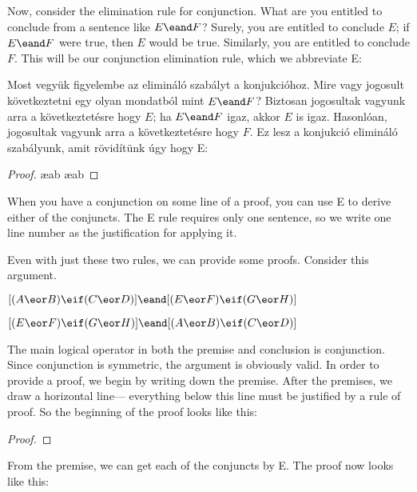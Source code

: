Now, consider the elimination rule for conjunction. What are you entitled to conclude from a sentence like $E \eand F$? Surely, you are entitled to conclude $E$; if $E \eand F$ were true, then $E$ would be true. Similarly, you are entitled to conclude $F$. This will be our conjunction elimination rule, which we abbreviate {\eand}E:

Most vegyük figyelembe az elimináló szabályt a konjukcióhoz. Mire vagy jogosult következtetni egy olyan mondatból mint $E \eand F$?  Biztosan jogosultak vagyunk arra a következtetésre hogy $E$; ha $E \eand F$ igaz, akkor $E$ is igaz. Hasonlóan, jogosultak vagyunk arra a következtetésre hogy $F$. Ez lesz a konjukció elimináló szabályunk, amit rövidítünk úgy hogy {\eand}E:

\begin{proof}
	 \ae{ab}
	 \ae{ab}
\end{proof}



When you have a conjunction on some line of a proof, you can use {\eand}E to derive either of the conjuncts. The {\eand}E rule requires only one sentence, so we write one line number as the justification for applying it.

Even with just these two rules, we can provide some proofs. Consider this argument.
\begin{earg}
\item[] $[(A\eor B)\eif(C\eor D)] \eand [(E \eor F) \eif (G\eor H)]$
\item[\therefore] $[(E \eor F) \eif (G\eor H)] \eand [(A\eor B)\eif(C\eor D)]$
\end{earg}
The main logical operator in both the premise and conclusion is conjunction. Since conjunction is symmetric, the argument is obviously valid. In order to provide a proof, we begin by writing down the premise. After the premises, we draw a horizontal line--- everything below this line must be justified by a rule of proof. So the beginning of the proof looks like this:

\begin{proof}
\end{proof}

From the premise, we can get each of the conjuncts by {\eand}E. The proof now looks like this:

